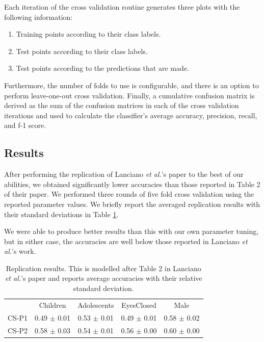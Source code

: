 \documentclass[sigconf]{acmart}
\begin{document}
Each iteration of the cross validation routine generates three plots with the following information:
\begin{enumerate}
    \item Training points according to their class labels.
    \item Test points according to their class labels.
    \item Test points according to the predictions that are made.
\end{enumerate}
Furthermore, the number of folds to use is configurable, and there is an option to perform leave-one-out cross validation.
Finally, a cumulative confusion matrix is derived as the sum of the confusion matrices in each of the cross validation iterations and used to calculate the classifier's average accuracy, precision, recall, and f-1 score.

\subsection{Results} \label{results}

After performing the replication of Lanciano \emph{et al.}'s paper to the best of our abilities, we obtained significantly lower accuracies than those reported in Table 2 of their paper.
We performed three rounds of five fold cross validation using the reported parameter values. We briefly report the averaged replication results with their standard deviations in Table \ref{tab:replication}.

We were able to produce better results than this with our own parameter tuning, but in either case, the accuracies are well below those reported in Lanciano \emph{et al.}'s work.

\begin{table}[t]
    \centering
    \caption{Replication results. This is modelled after Table 2 in Lanciano \emph{et al.}'s paper and reports average accuracies with their relative standard deviation.}
    \begin{tabular}{c c c c c}
        \hline
          & Children & Adolescents & EyesClosed & Male\\
        CS-P1 & 0.49 $\pm$ 0.01 & 0.53 $\pm$ 0.01 & 0.49 $\pm$ 0.01 & 0.58 $\pm$ 0.02\\
        CS-P2 & 0.58 $\pm$ 0.03 & 0.54 $\pm$ 0.01 & 0.56 $\pm$ 0.00 & 0.60 $\pm$ 0.00\\
        \hline
    \end{tabular}
    \label{tab:replication}
\end{table}
\end{document}
